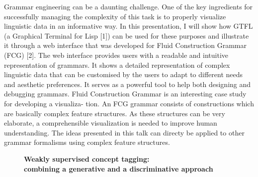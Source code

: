 \documentclass[10pt, a4paper, twopage, headinclude, footinclude, BCOR5mm]{book}
\begin{document}
\begin{table}[t!]
\end{table} 
\noindent
Grammar engineering can be a daunting challenge. One of the key ingredients for successfully managing the complexity of this task is to properly visualize linguistic data in an informative way. In this presentation, I will show how GTFL (a Graphical Terminal for Lisp [1]) can be used for these purposes and illustrate it through a web interface that was developed for Fluid Construction Grammar (FCG) [2]. The web interface provides users with a readable and intuitive representation of grammars. It shows a detailed representation of complex linguistic data that can be customised by the users to adapt to different needs and aesthetic preferences. It serves as a powerful tool to help both designing and debugging grammars. Fluid Construction Grammar is an interesting case study for developing a visualiza- tion. An FCG grammar consists of constructions which are basically complex feature structures. As these structures can be very elaborate, a comprehensible visualization is needed to improve human understanding. The ideas presented in this talk can directy be applied to other grammar formalisms using complex feature structures.   

\newpage

\begin{figure}[t!]
\centering
\large\textbf{Weakly supervised concept tagging: \\ combining a generative and a discriminative approach}
\vspace*{0.5cm}
\end{figure}
\end{document}
